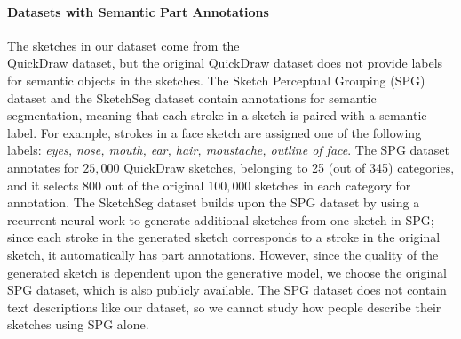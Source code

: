 \paragraph{Datasets with Semantic Part Annotations}
The sketches in our dataset come from the \\
QuickDraw dataset, but the original QuickDraw dataset does not provide labels for semantic objects in the sketches. 
The Sketch Perceptual Grouping (SPG) dataset \citep{spg_paper} and the SketchSeg dataset \citep{sketchsegDataset} contain annotations for semantic segmentation, meaning that each stroke in a sketch is paired with a semantic label. For example, strokes in a face sketch are assigned one of the following labels: \textit{eyes, nose, mouth, ear, hair, moustache, outline of face}. 
The SPG dataset annotates for $25,000$ QuickDraw sketches, belonging to 25 (out of 345) categories, and it selects 800 out of the original $100,000$ sketches in each category for annotation. 
The SketchSeg dataset builds upon the SPG dataset by using a recurrent neural work to generate additional sketches from one sketch in SPG; since each stroke in the generated sketch corresponds to a stroke in the original sketch, it automatically has part annotations. However, since the quality of the generated sketch is dependent upon the generative model, we choose the original SPG dataset, which is also publicly available. 
The SPG dataset does not contain text descriptions like our dataset, so we cannot study how people describe their sketches using SPG alone. 


